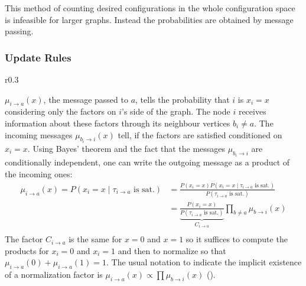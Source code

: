 This method of counting desired configurations in the whole configuration space is infeasible for larger graphs. Instead the probabilities are obtained by message passing.

\subsubsection{Update Rules}


\begin{wrapfigure}{r}{0.3\textwidth}

\end{wrapfigure}
$\mu_{i \rightarrow a}(x)$, the message passed to $a$, tells the probability that $i$ is $x_i = x$ considering only the factors on $i$'s side of the graph. \newline The node $i$ receives information about these factors through its neighbour vertices $b_i \neq a$. The incoming messages $\mu_{b_i \rightarrow i}(x)$ tell, if the factors are satisfied conditioned on $x_i = x$. \newline
Using Bayes' theorem and the fact that the messages $\mu_{b_i \rightarrow i}$ are conditionally independent, one can write the outgoing message  as a product of the incoming ones:
\begin{align*}
\mu_{i\rightarrow a}(x) = P(x_i = x \; | \; \tau_{i \rightarrow a} \text{ is sat.})
&= \frac{P(x_i = x) P(x_i = x \; | \; \tau_{i \rightarrow a} \text{ is sat.})}{P(\tau_{i \rightarrow a} \text{ is sat.})} \\
&= \underbrace{\frac{P(x_i = x)}{P(\tau_{i \rightarrow a}\text{ is sat.})}}_{C_{i \rightarrow a}} \prod_{b \neq a} \mu_{b \rightarrow i}(x) \\
\end{align*}
The factor $C_{i \rightarrow a}$ is the same for $x=0$ and $x=1$ so it suffices to compute the products for $x_i = 0$ and $x_i = 1$ and then to normalize so that $\mu_{i\rightarrow a}(0) + \mu_{i \rightarrow a}(1) = 1$. The usual notation to indicate the implicit existence of a normalization factor is $\mu_{i \rightarrow a}(x) \propto \prod \mu_{b \rightarrow i}(x)$ (\cite{lecture}). 

